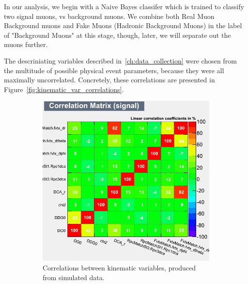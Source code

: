 In our analysis, we begin with a Naive Bayes classifer which is trained to
classify two signal muons, vs background muons. We combine both Real Muon
Background muons and Fake Muons (Hadronic Background Muons) in the label of
"Background Muons" at this stage, though, later, we will separate out the muons
further.

The descriniating variables described in~\ref{ch:data_collection} were
chosen from the multitude of possible physical event parameters, because they
were all maximally uncorrelated. Concretely, these correlations are presented in
Figure~\ref{fig:kinematic_var_correlations}.

\begin{figure}[H]
	\centering
	\begin{subfigure}[t]{0.5\textwidth}
		\centering
		\includegraphics[width=0.95\linewidth]{./figures/CorrelationMatrix_Signal.png}
		\caption{Correlations between kinematic variables, produced from simulated
			data.}
		\label{fig:corr_mat_sig}
	\end{subfigure}%
  \begin{subfigure}[t]{0.5\textwidth}
		\centering

\end{subfigure}
\end{figure}
